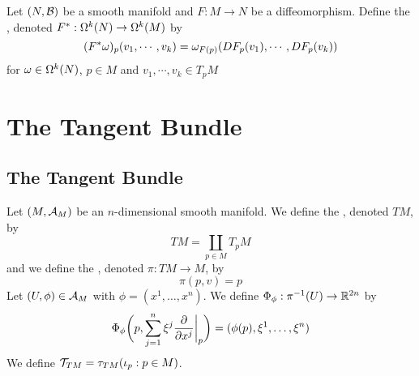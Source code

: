 \documentclass{book}
\begin{document}
	
	\begin{defn}
		Let $(N, \mathcal{B})$ be a smooth manifold and $F: M \rightarrow N$ be a diffeomorphism. Define the , denoted $F^*: \Omega^k(N) \rightarrow \Omega^k(M)$ by  $$(F^* \omega)_p (v_1, \cdots, v_k) = \omega_{F(p)} (DF_p(v_1), \cdots, DF_p(v_k))$$ for $\omega \in \Omega^k(N)$, $p \in M$ and $v_1, \cdots, v_k \in T_{p}M$
	\end{defn}


	




































\newpage
\chapter{The Tangent Bundle}

\section{The Tangent Bundle}

\begin{defn}
	Let $(M, \mathcal{A}_M)$ be an $n$-dimensional smooth manifold. We define the , denoted $TM$, by  
	$$TM = \coprod_{p \in M} T_p M $$ 
	and we define the , denoted $\pi: TM \rightarrow M$, by 
	$$\pi(p, v) = p$$
	Let $(U, \phi) \in \mathcal{A}_M$ with $\phi = (x^1, \ldots, x^n)$. We define $\Phi_{\phi}: \pi^{-1}(U) \rightarrow \mathbb{R}^{2n}$ by 
	$$\Phi_{\phi} \bigg(p, \sum_{j=1}^n \xi^j \frac{\partial}{\partial x^j} \bigg|_p \bigg) = (\phi(p), \xi^1, \ldots, \xi^n)$$ 
	We define $\mathcal{T}_{TM} = \tau_{TM}(\iota_p : p \in M)$.
\end{defn}
\end{document}
